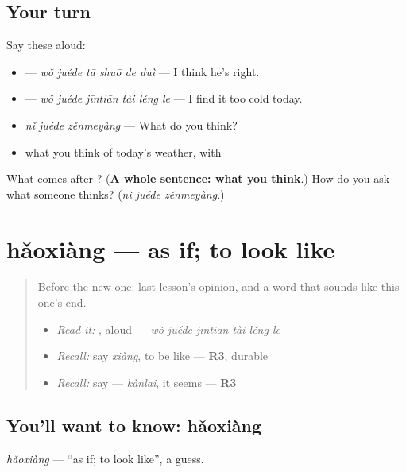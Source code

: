 \subsection*{Your turn}
Say these aloud:

\begin{itemize}
\raggedright
  \item {} — \emph{wǒ juéde tā shuō de duì} — I think he's right.
  \item {} — \emph{wǒ juéde jīntiān tài lěng le} — I find it too cold today.
  \item \emph{nǐ juéde zěnmeyàng} — What do you think?
  \item what you think of today's weather, with 
\end{itemize}

\begin{tcolorbox}[breakable,colback=teal!4,colframe=teal!35!black,title={Before you move on}]
What comes after ? (\textbf{A whole sentence: what you think}.) How do you ask what someone thinks? (\emph{nǐ juéde zěnmeyàng}.)
\end{tcolorbox}
\section[hǎoxiàng]{hǎoxiàng — as if; to look like}

\label{lesson:ZH-C280-haoxiang}



\begin{quote}
Before the new one: last lesson's opinion, and a word that sounds like this one's end.

\begin{itemize}
\raggedright
  \item \emph{Read it:} , aloud — \emph{wǒ juéde jīntiān tài lěng le}
  \item \emph{Recall:} say \emph{xiàng}, to be like — \textbf{R3}, durable
  \item \emph{Recall:} say  — \emph{kànlai}, it seems — \textbf{R3}
\end{itemize}
\end{quote}

\subsection*{You'll want to know: hǎoxiàng}
\emph{hǎoxiàng} — \textquotedblleft{}as if; to look like\textquotedblright{}, a guess.

